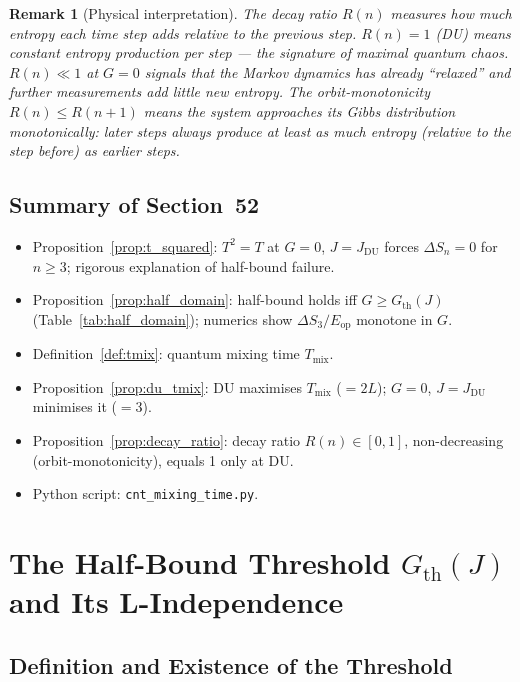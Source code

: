 \documentclass[12pt,a4paper]{article}
\newtheorem{remark}[theorem]{Remark}
\begin{document}
\begin{remark}[Physical interpretation]
The decay ratio $R(n)$ measures how much entropy each time step adds relative to
the previous step.  $R(n)=1$ (DU) means constant entropy production per step —
the signature of maximal quantum chaos.
$R(n)\ll1$ at $G=0$ signals that the Markov dynamics has already ``relaxed'' and
further measurements add little new entropy.
The orbit-monotonicity $R(n)\leq R(n+1)$ means the system approaches its Gibbs
distribution monotonically: later steps always produce at least as much entropy
(relative to the step before) as earlier steps.
\end{remark}

\subsection*{Summary of Section~52}
\begin{itemize}
\item Proposition~\ref{prop:t_squared}: $T^2=T$ at $G=0$, $J=J_\mathrm{DU}$
  forces $\Delta S_n=0$ for $n\geq3$; rigorous explanation of half-bound failure.
\item Proposition~\ref{prop:half_domain}: half-bound holds iff $G\geq G_\mathrm{th}(J)$
  (Table~\ref{tab:half_domain}); numerics show $\Delta S_3/E_\mathrm{op}$ monotone in $G$.
\item Definition~\ref{def:tmix}: quantum mixing time $T_\mathrm{mix}$.
\item Proposition~\ref{prop:du_tmix}: DU maximises $T_\mathrm{mix}$ ($=2L$);
  $G=0$, $J=J_\mathrm{DU}$ minimises it ($=3$).
\item Proposition~\ref{prop:decay_ratio}: decay ratio $R(n)\in[0,1]$, non-decreasing
  (orbit-monotonicity), equals 1 only at DU.
\item Python script: \texttt{cnt\_mixing\_time.py}.
\end{itemize}

\section{The Half-Bound Threshold $G_\mathrm{th}(J)$ and Its L-Independence}
\label{sec:threshold}

\subsection{Definition and Existence of the Threshold}
\label{subsec:gth_def}
\end{document}
